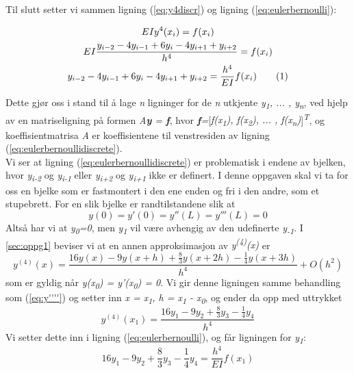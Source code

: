 Til slutt setter vi sammen ligning (\ref{eq:y4discr}) og ligning (\ref{eq:eulerbernoulli}):
\begin{center}
\begin{gather*}
EIy^{4}(x_i) = f(x_i) \\
EI \frac{y_{i-2} - 4y_{i-1} + 6y_i - 4y_{i+1} + y_{i+2}}{h^4} = f(x_i) \\
y_{i-2} - 4y_{i-1} + 6y_i - 4y_{i+1} + y_{i+2} = \frac{h^4}{EI}f(x_i) \numberthis \label{eq:eulerbernoullidiscrete}
\end{gather*}
\end{center}

Dette gjør oss i stand til å lage \textit{n} ligninger for de \textit{n} utkjente \textit{y\textsubscript{1}, ... , y\textsubscript{n}}, ved hjelp av en matriseligning på formen \textit{A\textbf{y} = \textbf{f}}, hvor \textit{\textbf{f}=}[\textit{f(x\textsubscript{1}), f(x\textsubscript{2}), ... , f(x\textsubscript{n})}]\textsuperscript{\textit{T}}, og koeffisientmatrisa \textit{A} er koeffisientene til venstresiden av ligning (\ref{eq:eulerbernoullidiscrete}).\\

Vi ser at ligning (\ref{eq:eulerbernoullidiscrete}) er problematisk i endene av bjelken, hvor \textit{y\textsubscript{i-2}} og \textit{y\textsubscript{i-1}} eller \textit{y\textsubscript{i+2}} og \textit{y\textsubscript{i+1}} ikke er definert. I denne oppgaven skal vi ta for oss en bjelke som er fastmontert i den ene enden og fri i den andre, som et stupebrett. For en slik bjelke er randtilstandene slik at
\begin{equation*}
y(0) = y'(0) = y''(L) = y'''(L) = 0
\end{equation*}
Altså har vi at \textit{y\textsubscript{0}=0}, men \textit{y\textsubscript{1}} vil være avhengig av den udefinerte \textit{y\textsubscript{-1}}. I \ref{sec:oppg1} beviser vi at en annen approksimasjon av \textit{y\textsuperscript{(4)}(x)} er
\begin{equation} \label{eq:y4xapprox2}
y^{(4)}(x) = \frac{16y(x) - 9y(x+h) +\frac{8}{3}y(x+2h)-\frac{1}{4}y(x+3h)}{h^4} + O(h^2)
\end{equation}
som er gyldig når \textit{y(x\textsubscript{0}) = y'(x\textsubscript{0}) = 0}. Vi gir denne ligningen samme behandling som (\ref{eq:y''''}) og setter inn \textit{x = x\textsubscript{1}, h = x\textsubscript{1} - x\textsubscript{0}}, og ender da opp med uttrykket
\begin{equation}\label{eq:y4x1}
y^{(4)}(x_1) = \frac{16y_1 - 9y_2 +\frac{8}{3}y_3-\frac{1}{4}y_4}{h^4}
\end{equation}
Vi setter dette inn i ligning (\ref{eq:eulerbernoulli}), og får ligningen for \textit{y\textsubscript{1}}:
\begin{equation} \label{eq:eulerbernoullix1}
16y_1 - 9y_2 + \frac{8}{3}y_3 - \frac{1}{4}y_4 = \frac{h^4}{EI}f(x_1)
\end{equation}

